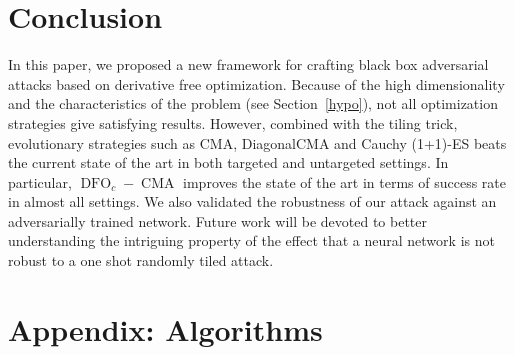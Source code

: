 \section{Conclusion}
\label{sec:conc}
In this paper, we proposed a new framework for crafting black box adversarial attacks based on derivative free optimization. Because of the high dimensionality and the characteristics of the problem (see Section~\ref{hypo}), not all optimization strategies give satisfying results. However, combined with the tiling trick, evolutionary strategies such as CMA, DiagonalCMA and  Cauchy (1+1)-ES beats the current state of the art in both targeted and untargeted settings.  In particular, $\operatorname{DFO}_c-\operatorname{CMA}$ improves the state of the art in terms of success rate in almost all settings. We also validated the robustness of our attack against an adversarially trained network. Future work will be devoted to better understanding the intriguing property of the effect that a neural network is not robust to a one shot randomly tiled attack.










    
\newpage

\section{Appendix: Algorithms}
